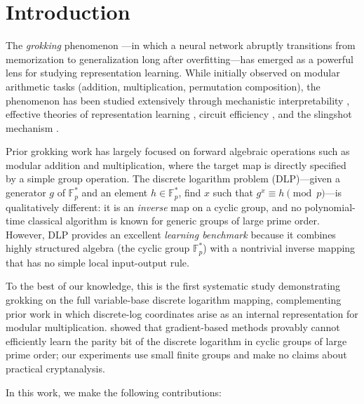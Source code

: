 \documentclass[11pt]{article}
\newcommand{\Fps}{\mathbb{F}_p^*}
\begin{document}

\section{Introduction}
\label{sec:intro}

The \emph{grokking} phenomenon \citep{power2022grokking}---in which a neural network abruptly transitions from memorization to generalization long after overfitting---has emerged as a powerful lens for studying representation learning. While initially observed on modular arithmetic tasks (addition, multiplication, permutation composition), the phenomenon has been studied extensively through mechanistic interpretability \citep{nanda2023progress}, effective theories of representation learning \citep{liu2022understanding}, circuit efficiency \citep{varma2023explaining}, and the slingshot mechanism \citep{thilak2022slingshot}.

Prior grokking work has largely focused on forward algebraic operations such as modular addition and multiplication, where the target map is directly specified by a simple group operation. The discrete logarithm problem (DLP)---given a generator $g$ of $\Fps$ and an element $h \in \Fps$, find $x$ such that $g^x \equiv h \pmod{p}$---is qualitatively different: it is an \emph{inverse} map on a cyclic group, and no polynomial-time classical algorithm is known for generic groups of large prime order. However, DLP provides an excellent \emph{learning benchmark} because it combines highly structured algebra (the cyclic group $\Fps$) with a nontrivial inverse mapping that has no simple local input-output rule.

To the best of our knowledge, this is the first systematic study demonstrating grokking on the full variable-base discrete logarithm mapping, complementing prior work in which discrete-log coordinates arise as an internal representation for modular multiplication. \citet{takhanov2024intractability} showed that gradient-based methods provably cannot efficiently learn the parity bit of the discrete logarithm in cyclic groups of large prime order; our experiments use small finite groups and make no claims about practical cryptanalysis.

In this work, we make the following contributions:
\end{document}
